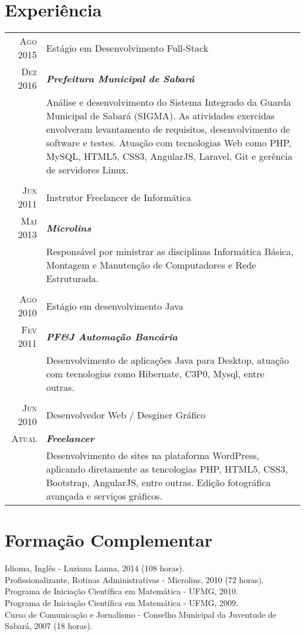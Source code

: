 \documentclass[a4paper,10pt]{article}
\begin{document}
\section{Experiência}
\begin{tabular}{r|p{13.1cm}}
	\textsc{Ago 2015} & Estágio em Desenvolvimento Full-Stack \\
	\textsc{Dez 2016}&\emph{\textbf{Prefeitura Municipal de Sabará}}\\
		 &\footnotesize{Análise e desenvolvimento do Sistema Integrado da Guarda Municipal de Sabará (SIGMA). As atividades exercidas envolveram levantamento de requisitos, desenvolvimento de software e testes. Atuação com tecnologias Web como PHP, MySQL, HTML5, CSS3, AngularJS, Laravel, Git e gerência de servidores Linux.}\\
	\multicolumn{2}{c}{} \\
	\textsc{Jun 2011} & Instrutor Freelancer de Informática \\
	\textsc{Mai 2013} & \emph{\textbf{Microlins}}\\
		 &\footnotesize{Responsável por ministrar as disciplinas Informática Básica, Montagem e Manutenção de Computadores e Rede Estruturada.}\\
	\multicolumn{2}{c}{} \\
	\textsc{Ago 2010} & Estágio em desenvolvimento Java\\
	\textsc{Fev 2011}&\emph{\textbf{PF\&J Automação Bancária}}\\
		& \footnotesize{Desenvolvimento de aplicações Java para Desktop, atuação com tecnologias como Hibernate, C3P0, Mysql, entre outras.}\\
	\multicolumn{2}{c}{} \\
	\textsc{Jun 2010} & Desenvolvedor Web / Desginer Gráfico\\
		\textsc{Atual}&\emph{\textbf{Freelancer}}\\
		&\footnotesize{Desenvolvimento de sites na plataforma WordPress, aplicando diretamente as tencologias PHP, HTML5, CSS3, Bootstrap, AngularJS, entre outras. Edição fotográfica avançada e serviços gráficos.}\\
\end{tabular}

\section{Formação Complementar}
Idioma, Inglês - Luziana Lanna, \textsc{2014} (108 horas).\\
Profissionalizante, Rotinas Administrativas - Microlins, \textsc{2010} (72 horas).\\
Programa de Iniciação Científica em Matemática - UFMG, 2010.\\
Programa de Iniciação Científica em Matemática - UFMG, 2009.\\
Curso de Comunicação e Jornalismo - Conselho Municipal da Juventude de Sabará, 2007 (18 horas).
\end{document}
